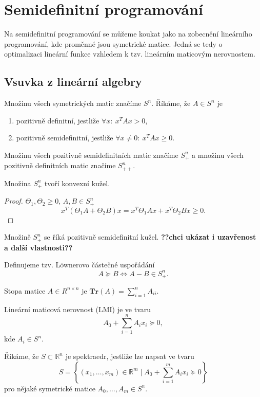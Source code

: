 \chapter{Semidefinitní programování}

Na semidefinitní programování se můžeme koukat jako na zobecnění lineárního programování, kde proměnné jsou symetrické matice. Jedná se tedy o optimalizaci lineární funkce vzhledem k tzv. lineárním maticovým nerovnostem.

\section{Vsuvka z lineární algebry}

Množinu všech symetrických matic značíme $S^n$. Říkáme, že $A \in S^n$ je
\begin{enumerate}
    \item pozitivně definitní, jestliže $\forall x:\ x^TAx >0$,
    \item pozitivně semidefinitní, jestliže $\forall x \neq 0:\ x^TAx \geq 0$.
\end{enumerate}

Množinu všech pozitivně semidefinitních matic značíme $S_+^n$ a množinu všech pozitivně definitních matic značíme $S_{++}^n$. 

\begin{vt}
    Množina $S_+^n$ tvoří konvexní kužel.
\end{vt}

\begin{proof}
    $\Theta_1, \Theta_2 \geq 0$, $A, B \in S_+^n$
    $$
        x^T \left( \Theta_1 A + \Theta_2 B \right) x = x^T \Theta_1 A x + x^T \Theta_2 B x \geq 0.
    $$
\end{proof}

Množině $S_+^n$ se říká pozitivně semidefinitní kužel. \textbf{??chci ukázat i uzavřenost a další vlastnosti??}

Definujeme tzv. L\"{o}wnerovo částečné uspořádání
$$
    A \succeq B \iff A - B \in S_+^n.
$$

Stopa matice $A \in R^{n \times n}$ je $\textbf{Tr}(A) = \sum_{i=1}^n A_{ii}$.

\begin{df}
    Lineární maticová nerovnost (LMI) je ve tvaru
    $$
        A_0 + \sum_{i=1}^n A_i x_i \succeq 0,
    $$
    kde $A_i \in S^n$.
\end{df}

\begin{df}
    Říkáme, že $S \subset \mathbb{R}^n$ je spektraedr, jestliže lze napsat ve tvaru
    $$
        S = \left\{ (x_1, \dots, x_m) \in \mathbb{R}^m \mid A_0 + \sum_{i=1}^m A_i x_i \succeq 0 \right\}
    $$
    pro nějaké symetrické matice $A_0, \dots, A_m \in S^n$.
\end{df}

